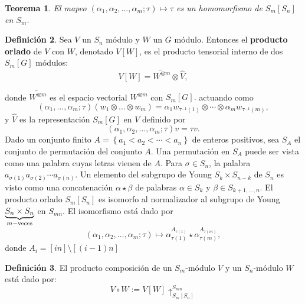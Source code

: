\documentclass[12pt]{book}
\newtheorem{theorem}{Teorema}[section]
\theoremstyle{definition}
\newtheorem{definition}[theorem]{Definición}
\newcounter{in}
\newcounter{ini}
\begin{document}
\begin{theorem}
  \label{pr_or_t1}
  El mapeo
  $(\alpha_{1},\alpha_{2},\ldots,\alpha_{m}; \tau) \mapsto \tau$ es un
  homomorfismo de $S_m\left [ S_n \right ]$ en $S_m$.
\end{theorem}
\begin{definition}
  \label{wre_pro}
  Sea $V$ un $S_n$ módulo y $W$ un $G$ módulo. Entonces el
  \textbf{producto orlado} de $V$ con $W$, denotado
  $V\left [ W \right ]$, es el producto tensorial interno de dos
  $S_m\left [ G \right ]$ módulos:
  $$V \left [ W \right ] = \widetilde{W^{\otimes m}} \otimes \hat{V},$$
\end{definition}
donde $ \widetilde{W^{\otimes m}}$ es el espacio vectorial
$W^{\otimes m}$ con $S_m \left [ G \right ] .$ actuando como
  \begin{equation}
    \label{eq:w_p_1}
    (\alpha_{1},\ldots,\alpha_{m}; \tau)(w_{1} \otimes \ldots \otimes w_{m}) = \alpha_{1}w_{\tau^{-1}(1)} \otimes \cdots \otimes \alpha_{m}w_{\tau^{-1}(m)}, 
  \end{equation}
y $\hat{V}$ es la representación
  $S_m \left [ G \right ]$ en $V$ definido por
  \begin{equation}
    \label{eq:106}
    (\alpha_{1},\alpha_{2},\ldots,\alpha_{m}; \tau)v = \tau v .
  \end{equation}
Dado un conjunto finito
$A = \left \{ a_1 < a_2< \cdots < a_n \right \}$ de enteros positivos,
sea $S_A$ el conjunto de permutación del conjunto $A$. Una permutación
en $S_A$ puede ser vista como una palabra cuyas letras vienen de
$A$. Para $\sigma \in S_n$, la palabra
$a_{\sigma(1)}a_{\sigma(2)} \cdots a_{\sigma(n)}$. Un elemento del
subgrupo de Young $S_{k} \times S_{n-k}$ de $S_n$ es visto como una
concatenación $\alpha \star \beta$ de palabras $\alpha \in S_k$ y
$\beta \in S_{k+1, \ldots, n}$. El producto orlado
$S_m \left [ S_n \right ]$ es isomorfo al normalizador al subgrupo de
Young $\underset{m-\textup{veces}}{\underbrace{S_n \times S_n}}$ en
$S_{mn}$. El isomorfismo está dado por
\begin{equation}
  \label{eq:107}
  (\alpha_{1},\alpha_{2},\ldots,\alpha_{m}; \tau) \mapsto \alpha_{\tau(1)}^{A_{\tau(1)}} \star \alpha_{\tau(m)}^{A_{\tau(m)}},
\end{equation}
donde $A_{i} = \left [ in \right ] \setminus  \left [ (i-1)n \right ]$
\begin{definition}
  El producto composición de un $S_{m}$-módulo $V$ y un $S_{n}$-módulo
  $W$ está dado por:
  \begin{equation}
    \label{eq:108}
    V \circ W := V \left [ W \right ] \uparrow^{S_{mn}}_{S_m \left [ S_n \right ]}
  \end{equation}
\end{definition}
\end{document}
